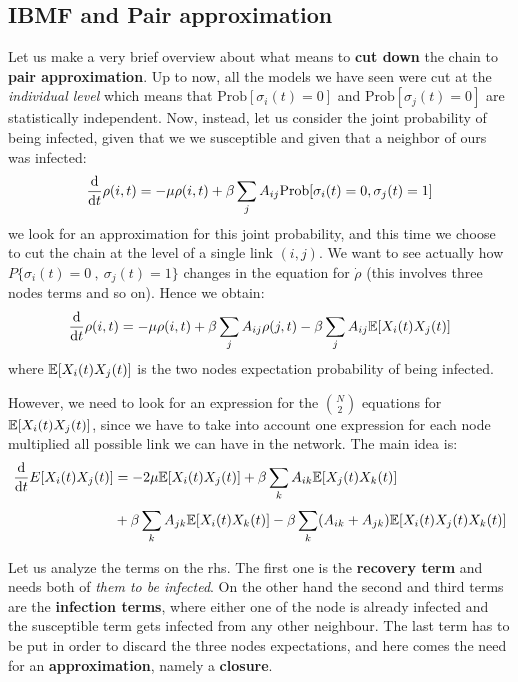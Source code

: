 \documentclass[../main/main.tex]{subfiles}
\begin{document}
\subsection{IBMF and Pair approximation}

Let us make a very brief overview about what means to \textbf{cut down} the chain to \textbf{pair approximation}.
Up to now, all the models we have seen were cut at the \textit{individual level} which means that \( \text{Prob} [\sigma _i (t)=0] \) and \( \text{Prob} [\sigma _j (t) = 0] \) are statistically independent. Now, instead, let us consider the joint probability of being infected, given that we we susceptible and given that a neighbor of ours was infected:
\begin{equation*}
  \dv{}{t} \rho (i,t) = - \mu \rho (i,t) + \beta \sum_{j}^{} A_{ij} \text{Prob} [\sigma _i(t)=0, \sigma _j(t)=1]
\end{equation*}
we look for an approximation for this joint probability, and this time we choose to cut the chain at the level of a single link $(i,j)$.
We want to see actually how $P\{\sigma_i(t) = 0\ ,\   \sigma_j (t) = 1\}$ changes in the equation for $\dot{\rho}$ (this involves three nodes terms and so on).
Hence we obtain:
\begin{equation*}
  \dv{}{t} \rho (i,t) = - \mu \rho (i,t) + \beta \sum_{j}^{} A_{ij} \rho (j,t) - \beta \sum_{j}^{} A_{ij} \mathbb{E} \qty[X_i (t) X_j (t)]
\end{equation*}
where \(  \mathbb{E} \qty[X_i (t) X_j (t)] \) is the two nodes expectation probability of being infected.

However, we need to look for an expression for the $\binom{N}{2}$ equations for \(  \mathbb{E}  \qty[X_i (t) X_j (t)] \), since we have to take into account one expression for each node multiplied all possible link we can have in the network.
The main idea is:
\begin{equation}
\begin{split}
  \dv{}{t} E \qty[X_i (t) X_j (t)] &=  - 2 \mu \mathbb{E} \qty[X_i (t) X_j (t)] + \beta \sum_{k}^{} A_{ik} \mathbb{E} \qty[X_j (t) X_k (t)]  \\
  & + \beta \sum_{k}^{} A_{jk} \mathbb{E} \qty[X_i (t) X_k (t)]  - \beta
  \sum_{k}^{} (A_{ik}+A_{jk}) \mathbb{E} \qty[X_i (t) X_j (t) X_k (t)]
\end{split}
\end{equation}

Let us analyze the terms on the rhs. The first one is the \textbf{recovery term} and needs both of \textit{them to be infected}. On the other hand the second and third terms are the \textbf{infection terms}, where either one of the node is already infected and the susceptible term gets infected from any other neighbour. The last term has to be put in order to discard the three nodes expectations, and here comes the need for an \textbf{approximation}, namely a \textbf{closure}.
\end{document}
